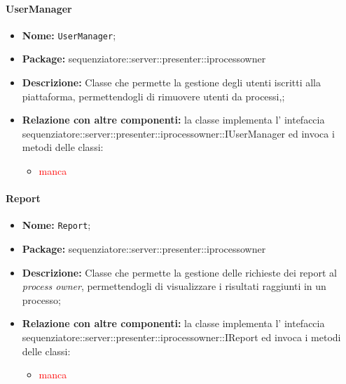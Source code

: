 \paragraph{UserManager}
	\begin{itemize}
		\item \textbf{Nome:} \texttt{UserManager};
		\item \textbf{Package:} sequenziatore::server::presenter::iprocessowner
		\item \textbf{Descrizione:} Classe che permette la gestione degli utenti iscritti alla piattaforma, permettendogli di rimuovere utenti da processi,;
		\item \textbf{Relazione con altre componenti:} la classe implementa l' intefaccia sequenziatore::server::presenter::iprocessowner::IUserManager ed invoca i metodi delle classi:
		\begin{itemize}
			\item \textcolor{red}{manca}
		\end{itemize}
	\end{itemize}

\paragraph{Report}
	\begin{itemize}
		\item \textbf{Nome:} \texttt{Report};
		\item \textbf{Package:} sequenziatore::server::presenter::iprocessowner
		\item \textbf{Descrizione:} Classe che permette la gestione delle richieste dei report al \textit{process owner}, permettendogli di visualizzare i risultati raggiunti in un processo;
		\item \textbf{Relazione con altre componenti:} la classe implementa l' intefaccia sequenziatore::server::presenter::iprocessowner::IReport ed invoca i metodi delle classi:
		\begin{itemize}
			\item \textcolor{red}{manca}
		\end{itemize}
	\end{itemize}

